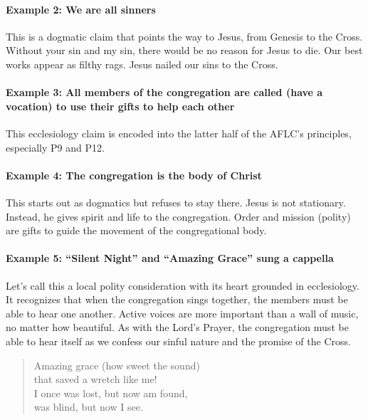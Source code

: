 \paragraph{Example 2: We are all sinners} 

This is a dogmatic claim that points the way to Jesus, from Genesis to the Cross. Without your sin and my sin, there would be no reason for Jesus to die. Our best works appear as filthy rags. Jesus nailed our sins to the Cross.

\paragraph{Example 3: All members of the congregation are called (have a vocation) to use their gifts to help each other} 

This ecclesiology claim is encoded into the latter half of the AFLC's principles, especially P9 and P12.


\paragraph{Example 4: The congregation is the body of Christ}

This starts out as dogmatics but refuses to stay there. Jesus is not stationary. Instead, he gives spirit and life to the congregation. Order and mission (polity) are gifts to guide the movement of the congregational body.

\paragraph{Example 5: ``Silent Night'' and ``Amazing Grace'' sung a cappella}

Let's call this a local polity consideration with its heart grounded in ecclesiology. It recognizes that when the congregation sings together, the members must be able to hear one another. Active voices are more important than a wall of music, no matter how beautiful. As with the Lord's Prayer, the congregation must be able to hear itself as we confess our sinful nature and the promise of the Cross.

\begin{quote}
Amazing grace (how sweet the sound)\\
that saved a wretch like me!\\
I once was lost, but now am found,\\
was blind, but now I see.\\
\end{quote}


